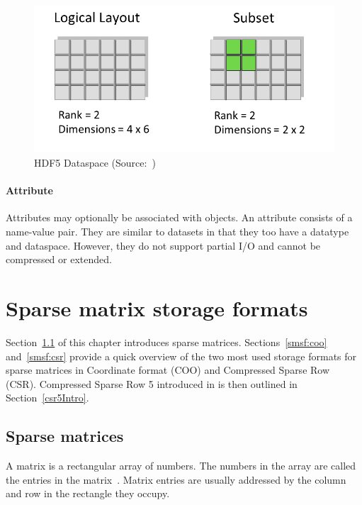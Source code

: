 \documentclass[thesis=M,english]{FITthesis}[2019/12/23]
\begin{document}
\begin{figure}[H]
    \centering
    \includegraphics[scale=0.3]{static/dataspace.png}
    \caption{HDF5 Dataspace (Source:~\cite{hdf5})}
\end{figure}



\subsubsection{Attribute}

Attributes may optionally be associated with objects. An attribute consists of a name-value pair.
They are similar to datasets in that they too have a datatype and dataspace. However, they do not
support partial I/O and cannot be compressed or extended.


\chapter{Sparse matrix storage formats}

Section~\ref{smsf:spm} of this chapter introduces sparse matrices. Sections~\ref{smsf:coo} and~\ref{smsf:csr}
provide a quick overview of the two most used storage formats for sparse matrices in Coordinate format (COO)
and Compressed Sparse Row (CSR). Compressed Sparse Row 5 introduced in \cite{liu2015csr5} is then outlined
in Section~\ref{csr5Intro}.


\section{Sparse matrices}\label{smsf:spm}

A matrix is a rectangular array of numbers. The numbers in the array
are called the entries in the matrix~\cite{anton14}. Matrix entries are usually addressed
by the column and row in the rectangle they occupy.
\end{document}
